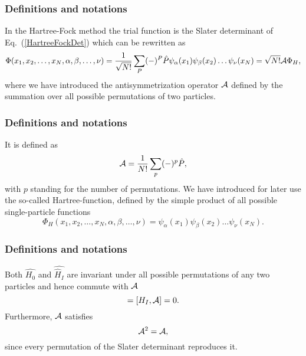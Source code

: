 \documentclass[compress]{beamer}
\begin{document}
\frame
{
  \frametitle{Definitions and notations}
\begin{small}
{\scriptsize
In the Hartree-Fock method the trial function is the Slater
determinant of Eq.~(\ref{HartreeFockDet}) which can be rewritten as 
\begin{equation}
  \Phi(x_1,x_2,\dots,x_N,\alpha,\beta,\dots,\nu) = \frac{1}{\sqrt{N!}}\sum_{P} (-)^P\hat{P}\psi_{\alpha}(x_1)
    \psi_{\beta}(x_2)\dots\psi_{\nu}(x_N)=\sqrt{N!}{\cal A}\Phi_H,
\label{HartreeFockPermutation}
\end{equation}
where we have introduced the antisymmetrization operator ${\cal A}$ defined by the 
summation over all possible permutations of two particles.
}
\end{small}
}

\frame
{
  \frametitle{Definitions and notations}
\begin{small}
{\scriptsize
It is defined as
\begin{equation}
  {\cal A} = \frac{1}{N!}\sum_{p} (-)^p\hat{P},
\label{antiSymmetryOperator}
\end{equation}
with $p$ standing for the number of permutations. We have introduced for later use the so-called
Hartree-function, defined by the simple product of all possible single-particle functions
\begin{equation*}
  \Phi_H(x_1,x_2,\dots,x_N,\alpha,\beta,\dots,\nu) =
  \psi_{\alpha}(x_1)
    \psi_{\beta}(x_2)\dots\psi_{\nu}(x_N).
\end{equation*}

}
\end{small}
}

\frame
{
  \frametitle{Definitions and notations}
\begin{small}
{\scriptsize
Both $\hat{H_0}$ and $\hat{\hat{H}_I}$ are invariant under all possible permutations of any two particles
and hence commute with ${\cal A}$
\begin{equation}
  [H_0,{\cal A}] = [H_I,{\cal A}] = 0.
  \label{cummutionAntiSym}
\end{equation}
Furthermore, ${\cal A}$ satisfies
\begin{equation}
  {\cal A}^2 = {\cal A},
  \label{AntiSymSquared}
\end{equation}
since every permutation of the Slater
determinant reproduces it. 
}
\end{small}
}
\end{document}
